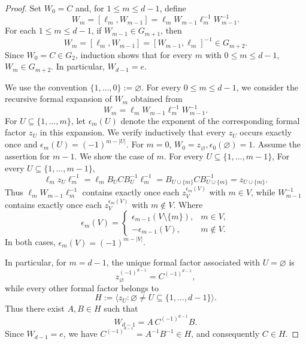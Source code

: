 \documentclass[11pt]{amsart}
\theoremstyle{definition}
\theoremstyle{remark}
\begin{document}
\begin{proof}
Set $W_0=C$ and, for $1\leq m\leq d-1$, define
\[
 W_m=[\ell_m,W_{m-1}]=\ell_mW_{m-1}\ell_m^{-1}W_{m-1}^{-1}.   
\]
For each $1\leq m\leq d-1$, if $W_{m-1}\in G_{m+1}$, then 
\[
 W_m =[\ell_m,W_{m-1}]=[W_{m-1},\ell_m]^{-1} \in G_{m+2}.
\]
Since $W_0=C\in G_2$, induction shows that for every $m$ with
$0\leq m\leq d-1$, $ W_m\in G_{m+2}$.
In particular, $W_{d-1}=e$.



We use the convention $\{1,\ldots,0\}:=\varnothing$.
For every $0\le m\le d-1$, we consider the recursive formal expansion of $W_m$ obtained from
\[
W_m=\ell_mW_{m-1}\ell_m^{-1}W_{m-1}^{-1}.
\]
For $U\subseteq\{1,\ldots,m\}$, let $\epsilon_m(U)$ denote the exponent of the corresponding formal factor $z_U$ in this expansion. We verify inductively that every $z_U$ occurs exactly once and $\epsilon_m(U)=(-1)^{m-|U|}$.
For $m=0$, $W_0=z_\varnothing, \epsilon_0(\varnothing)=1$.
Assume the assertion for $m-1$. We show the case of $m$.
For every $U\subseteq\{1,\ldots,m-1\}$,  For every $U\subseteq\{1,\ldots,m-1\}$,
\[
\ell_mz_U\ell_m^{-1}=\ell_mB_UCB_U^{-1}\ell_m^{-1}
=B_{U\cup\{m\}}CB_{U\cup\{m\}}^{-1}=z_{U\cup\{m\}}.
\]
Thus  $\ell_mW_{m-1}\ell_m^{-1}$ contains exactly once each $z_V^{\epsilon_m(V)}$ with $m\in V$,
while $W_{m-1}^{-1}$ contains exactly once each $z_V^{\epsilon_m(V)} $ with $m\notin V$.
Where  
\[
 \epsilon_m(V)=\begin{cases}
  \epsilon_{m-1}(V\setminus\{m\}),&m\in V,\\
  -\epsilon_{m-1}(V),&m\notin V.
 \end{cases}
\]
In both cases, $\epsilon_m(V)=(-1)^{m-|V|}$. 

In particular, for $m=d-1$, the unique formal factor associated with $U=\varnothing$ is
\[
z_{\varnothing}^{(-1)^{d-1}}=C^{(-1)^{d-1}},
\]
while every other formal factor belongs to
\[
H:=\big\langle z_U:\varnothing\neq U\subseteq\{1,\ldots,d-1\}
\big\rangle.
\]
Thus there exist $A,B\in H$ such that
\[
W_{d-1}=A\,C^{(-1)^{d-1}}B.
\]
Since $W_{d-1}=e$, we have $C^{(-1)^{d-1}}=A^{-1}B^{-1}\in H$,
and consequently $C\in H$. 
  
\end{proof}
\end{document}

